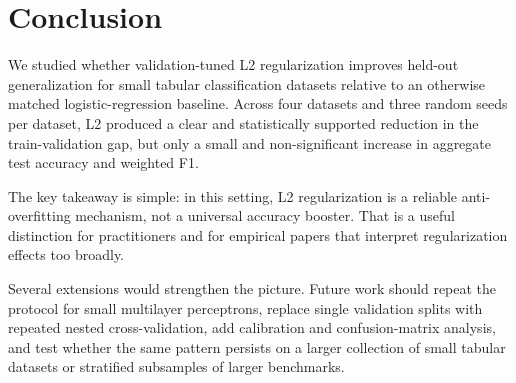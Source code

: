 \section{Conclusion}
\label{sec:conclusion}

We studied whether validation-tuned L2 regularization improves held-out generalization for small tabular classification datasets relative to an otherwise matched logistic-regression baseline. Across four datasets and three random seeds per dataset, L2 produced a clear and statistically supported reduction in the train-validation gap, but only a small and non-significant increase in aggregate test accuracy and weighted F1.

The key takeaway is simple: in this setting, L2 regularization is a reliable anti-overfitting mechanism, not a universal accuracy booster. That is a useful distinction for practitioners and for empirical papers that interpret regularization effects too broadly.

Several extensions would strengthen the picture. Future work should repeat the protocol for small multilayer perceptrons, replace single validation splits with repeated nested cross-validation, add calibration and confusion-matrix analysis, and test whether the same pattern persists on a larger collection of small tabular datasets or stratified subsamples of larger benchmarks.
